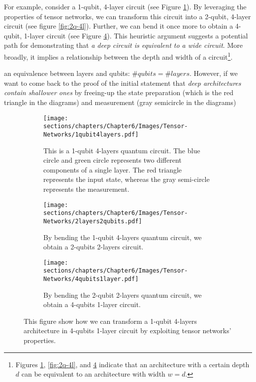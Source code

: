 \begin{itemize}
    For example, consider a 1-qubit, 4-layer circuit (see Figure \ref{fig:1q-4l}). By leveraging 
    the properties of tensor networks, we can transform this circuit into a 2-qubit, 4-layer circuit 
    (see figure \ref{fig:2q-4l}). Further, we can bend it once more to obtain a 4-qubit, 
    1-layer circuit (see Figure \ref{fig:4q-1l}). This heuristic argument suggests a potential path 
    for demonstrating that \textit{a deep circuit is equivalent to a wide circuit}. 
    More broadly, it implies a relationship between the depth and width of a 
    circuit\footnote[1]{Figures \ref{fig:1q-4l}, \ref{fig:2q-4l}, and \ref{fig:4q-1l} indicate 
    that an architecture with a certain depth $d$ can be equivalent to an architecture with width 
    $w = d$.}.
    
    
    an equivalence between layers and qubits: 
    $\# qubits = \# layers$.
    However, if we want to come back to the proof of the initial statement that \textit{deep architectures 
    contain shallower ones} by freeing-up the state preparation (which is the red triangle in the 
    diagrams) and measurement (gray semicircle in the diagrams) 

    \begin{figure}[h]
        \centering
        \begin{subfigure}[b]{\textwidth}
            \texttt{[image: sections/chapters/Chapter6/Images/Tensor-Networks/1qubit4layers.pdf]}
        \caption{This is a 1-qubit 4-layers quantum circuit. The blue circle and green circle represents two
        different components of a single layer. The red triangle represents the input state, whereas the 
        gray semi-circle represents the measurement.}
        \label{fig:1q-4l}
        \end{subfigure}
        \begin{subfigure}[b]{\textwidth}
        \vspace{10pt}
        \centering
            \texttt{[image: sections/chapters/Chapter6/Images/Tensor-Networks/2layers2qubits.pdf]}
        \caption{By bending the 1-qubit 4-layers quantum circuit, we obtain a 2-qubits 2-layers circuit.}
        \label{fig:2q-2l}
        \end{subfigure}
        \begin{subfigure}[b]{\textwidth}
        \vspace{10pt}
        \centering
            \texttt{[image: sections/chapters/Chapter6/Images/Tensor-Networks/4qubits1layer.pdf]}
        \caption{By bending the 2-qubit 2-layers quantum circuit, we obtain a 4-qubits 1-layer circuit.}
        \label{fig:4q-1l}
        \end{subfigure}
        \caption{This figure show how we can transform a 1-qubit 4-layers architecture in 4-qubits 1-layer 
        circuit by exploiting tensor networks' properties.}
    \end{figure}

    


\end{itemize}